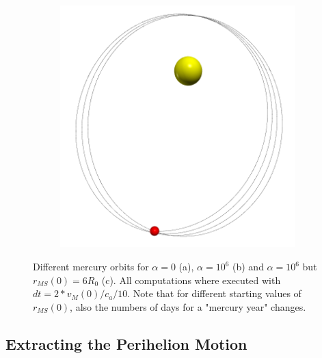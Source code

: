 \documentclass[12pt, UK english]{iopart}
\begin{document}
\begin{figure}[htb]
\begin{subfigure}[b]{0.3\textwidth}
		\caption{\label{fig:MercuryOrbit-a6-small}}
	\end{subfigure}
	~
	\begin{subfigure}[b]{0.3\textwidth}
		\includegraphics[width=\textwidth]{figs/a6T10dt20.png}
		\caption{\label{fig:MercuryOrbit-a6-big}}
	\end{subfigure}
	\caption{\label{fig:MercuryOrbit}%
		Different mercury orbits for $\alpha=0$ (a), $\alpha = 10^{6}$ (b) and $\alpha = 10^{6}$ but $r_{MS}(0) = 6 R_0$ (c).
		All computations where executed with $dt = 2 * v_{M}(0) / c_a / 10$.
		Note that for different starting values of $r_{MS}(0)$, also the numbers of days for a "mercury year" changes.
	}
\end{figure}

\subsection{Extracting the Perihelion Motion}

\end{document}

